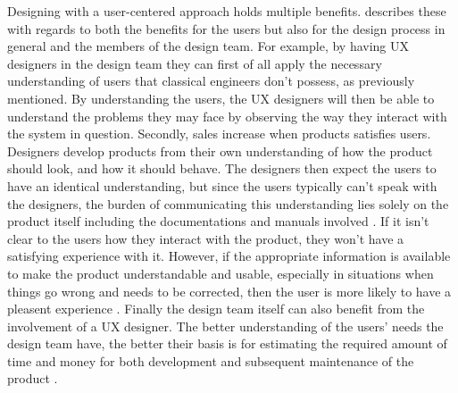 \noindent
Designing with a user-centered approach holds multiple benefits. \textcite{WEB:UXBenefits} describes these with regards to both the benefits for the users but also for the design process in general and the members of the design team. For example, by having UX designers in the design team they can first of all apply the necessary understanding of users that classical engineers don't possess, as previously mentioned. By understanding the users, the UX designers will then be able to understand the problems they may face by observing the way they interact with the system in question. Secondly, sales increase when products satisfies users. Designers develop products from their own understanding of how the product should look, and how it should behave. The designers then expect the users to have an identical understanding, but since the users typically can't speak with the designers, the burden of communicating this understanding lies solely on the product itself including the documentations and manuals involved \parencite[][31]{PDF:DonNorman}. If it isn't clear to the users how they interact with the product, they won't have a satisfying experience with it. However, if the appropriate information is available to make the product understandable and usable, especially in situations when things go wrong and needs to be corrected, then the user is more likely to have a pleasent experience \parencite[][32]{PDF:DonNorman}. Finally the design team itself can also benefit from the involvement of a UX designer. The better understanding of the users' needs the design team have, the better their basis is for estimating the required amount of time and money for both development and subsequent maintenance of the product \parencite{WEB:UXBenefits}.\\

